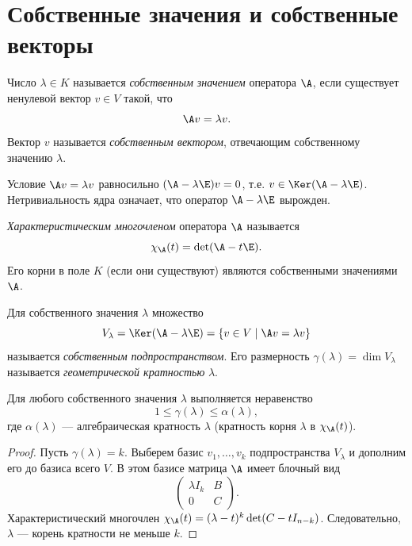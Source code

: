 \documentclass[10pt]{article}
\begin{document}
\section{Собственные значения и собственные векторы}

\begin{definition}
    Число $\lambda \in K$ называется \textit{собственным значением} оператора $\A$, если существует ненулевой вектор $v\in V$ такой, что
    \[
    \A v = \lambda v.
    \]
    Вектор $v$ называется \textit{собственным вектором}, отвечающим собственному значению $\lambda$.
\end{definition}

Условие $\A v = \lambda v$ равносильно $(\A - \lambda \E)v = 0$, т.е. $v \in \Ker(\A-\lambda\E)$. Нетривиальность ядра означает, что оператор $\A-\lambda\E$ вырожден.

\begin{definition}
    \textit{Характеристическим многочленом} оператора $\A$ называется
    \[
    \chi_\A(t) = \det(\A - t\E).
    \]
    Его корни в поле $K$ (если они существуют) являются собственными значениями $\A$.
\end{definition}

\begin{definition}
    Для собственного значения $\lambda$ множество
    \[
    V_\lambda = \Ker(\A-\lambda\E) = \{v\in V \mid \A v = \lambda v\}
    \]
    называется \textit{собственным подпространством}. Его размерность $\gamma(\lambda)=\dim V_\lambda$ называется \textit{геометрической кратностью} $\lambda$.
\end{definition}

\begin{theorem}
    Для любого собственного значения $\lambda$ выполняется неравенство
    \[
    1 \le \gamma(\lambda) \le \alpha(\lambda),
    \]
    где $\alpha(\lambda)$ --- алгебраическая кратность $\lambda$ (кратность корня $\lambda$ в $\chi_\A(t)$).
\end{theorem}
\begin{proof}
    Пусть $\gamma(\lambda)=k$. Выберем базис $v_1,\dots,v_k$ подпространства $V_\lambda$ и дополним его до базиса всего $V$. В этом базисе матрица $\A$ имеет блочный вид
    \[
    \begin{pmatrix}
    \lambda I_k & B \\
    0 & C
    \end{pmatrix}.
    \]
    Характеристический многочлен $\chi_\A(t)=(\lambda-t)^k \det(C-tI_{n-k})$. Следовательно, $\lambda$ --- корень кратности не меньше $k$.
\end{proof}
\end{document}
